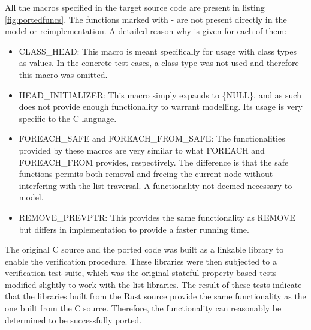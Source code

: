All the macros specified in the target source code are present in listing \ref{fig:portedfuncs}. The functions marked with - are not present directly in the model or reimplementation. A detailed reason why is given for each of them:

\begin{itemize}
    \item CLASS\_HEAD: This macro is meant specifically for usage with class types as values. In the concrete test cases, a class type was not used and therefore this macro was omitted. 
    \item HEAD\_INITIALIZER: This macro simply expands to \{NULL\}, and as such does not provide enough functionality to warrant modelling. Its usage is very specific to the C language.
    \item FOREACH\_SAFE and FOREACH\_FROM\_SAFE: The functionalities provided by these macros are very similar to what FOREACH and FOREACH\_FROM provides, respectively. The difference is that the safe functions permits both removal and freeing the current node without interfering with the list traversal. A functionality not deemed necessary to model. 
    \item REMOVE\_PREVPTR: This provides the same functionality as REMOVE but differs in implementation to provide a faster running time.
\end{itemize}


The original C source and the ported code was built as a linkable library to enable the verification procedure. These libraries were then subjected to a verification test-suite, which was the original stateful property-based tests modified slightly to work with the list libraries. The result of these tests indicate that the libraries built from the Rust source provide the same functionality as the one built from the C source. Therefore, the functionality can reasonably be determined to be successfully ported.
